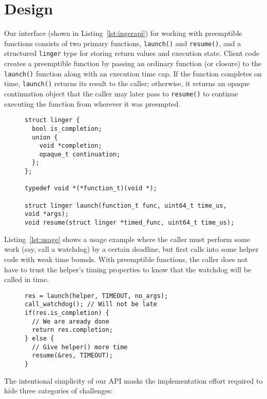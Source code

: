\section{Design}

Our interface (shown in Listing~\ref{lst:ingerapi}) for working with
preemptible functions consists of two primary functions, \texttt{launch()} and
\texttt{resume()}, and a structured \texttt{linger} type for storing return values
and execution state.  Client code creates a preemptible function by passing an
ordinary function (or closure) to the \texttt{launch()} function along with an
execution time cap.  If the function completes on time,
\texttt{launch()} returns its result to the caller; otherwise, it returns an opaque
continuation object that the caller may later pass to \texttt{resume()} to continue
executing the function from wherever it was preempted.

\begin{figure}
\begin{lstlisting}[label=lst:ingerapi,caption=Preemptible functions C-language interface]
struct linger {
  bool is_completion;
  union {
    void *completion;
    opaque_t continuation;
  };
};

typedef void *(*function_t)(void *);

struct linger launch(function_t func, uint64_t time_us, void *args);
void resume(struct linger *timed_func, uint64_t time_us);
\end{lstlisting}
\end{figure}

Listing~\ref{lst:usage} shows a usage example where the caller must
perform some work (say, call a watchdog) by a certain deadline, but first
calls into some helper code with weak time bounds.  With preemptible functions,
the caller does not have to trust the helper's timing properties to know that the
watchdog will be called
in time.

\begin{figure}
\begin{lstlisting}[label=lst:usage,caption=Preemptible function usage example]
res = launch(helper, TIMEOUT, no_args);
call_watchdog(); // Will not be late
if(res.is_completion) {
  // We are aready done
  return res.completion;
} else {
  // Give helper() more time
  resume(&res, TIMEOUT);
}
\end{lstlisting}
\end{figure}

The intentional simplicity of our API masks the implementation effort required to
hide three categories of challenges:

